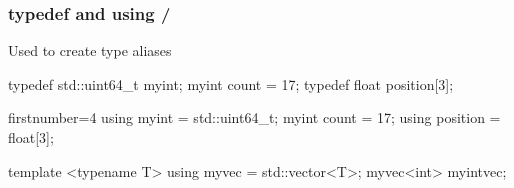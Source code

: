 \begin{frame}[fragile]
  \frametitle{typedef and using \hfill {} / }
  Used to create type aliases
  \begin{alertblock}{}
    \begin{cppcode*}{}
      typedef std::uint64_t myint;
      myint count = 17;
      typedef float position[3];
    \end{cppcode*}
  \end{alertblock}
  \begin{exampleblock}{}
    \begin{cppcode*}{firstnumber=4}
      using myint = std::uint64_t;
      myint count = 17;
      using position = float[3];

      template <typename T> using myvec = std::vector<T>;
      myvec<int> myintvec;
    \end{cppcode*}
  \end{exampleblock}
\end{frame}
